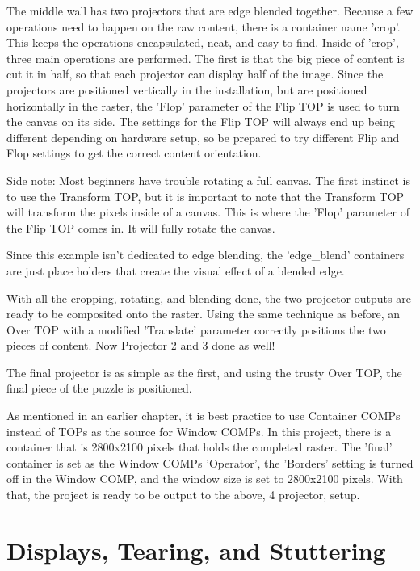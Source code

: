 \begin{fullwidth}
The middle wall has two projectors that are edge blended together. Because a few operations need to happen on the raw content, there is a container name 'crop'. This keeps the operations encapsulated, neat, and easy to find. Inside of 'crop', three main operations are performed. The first is that the big piece of content is cut it in half, so that each projector can display half of the image. Since the projectors are positioned vertically in the installation, but are positioned horizontally in the raster, the 'Flop' parameter of the Flip TOP is used to turn the canvas on its side. The settings for the Flip TOP will always end up being different depending on hardware setup, so be prepared to try different Flip and Flop settings to get the correct content orientation.

Side note: Most beginners have trouble rotating a full canvas. The first instinct is to use the Transform TOP, but it is important to note that the Transform TOP will transform the pixels inside of a canvas. This is where the 'Flop' parameter of the Flip TOP comes in. It will fully rotate the canvas.

Since this example isn't dedicated to edge blending, the 'edge\_blend' containers are just place holders that create the visual effect of a blended edge. 

With all the cropping, rotating, and blending done, the two projector outputs are ready to be composited onto the raster. Using the same technique as before, an Over TOP with a modified 'Translate' parameter correctly positions the two pieces of content. Now Projector 2 and 3 done as well!

The final projector is as simple as the first, and using the trusty Over TOP, the final piece of the puzzle is positioned.
 
As mentioned in an earlier chapter, it is best practice to use Container COMPs instead of TOPs as the source for Window COMPs. In this project, there is a container that is 2800x2100 pixels that holds the completed raster. The 'final' container is set as the Window COMPs 'Operator', the 'Borders' setting is turned off in the Window COMP, and the window size is set to 2800x2100 pixels. With that, the project is ready to be output to the above, 4 projector, setup.

\end{fullwidth}


\section{Displays, Tearing, and Stuttering}

